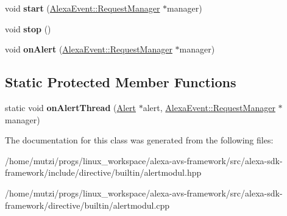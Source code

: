 \begin{DoxyCompactItemize}
\item 
\mbox{\label{classdirective_1_1Alert_a83b488b21df6d2e1dce21d8c9c253a8e}} 
void {\bfseries start} (\hyperlink{classAlexaEvent_1_1RequestManager}{Alexa\+Event\+::\+Request\+Manager} $\ast$manager)
\item 
\mbox{\label{classdirective_1_1Alert_a1f5d56e7494f5d8eb85a0f308a233e43}} 
void {\bfseries stop} ()
\item 
\mbox{\label{classdirective_1_1Alert_a55d52856f9ca04edabf2cfda08649c9c}} 
void {\bfseries on\+Alert} (\hyperlink{classAlexaEvent_1_1RequestManager}{Alexa\+Event\+::\+Request\+Manager} $\ast$manager)
\end{DoxyCompactItemize}
\subsection*{Static Protected Member Functions}
\begin{DoxyCompactItemize}
\item 
\mbox{\label{classdirective_1_1Alert_a40b28e621845769fe442dcfb7d2750aa}} 
static void {\bfseries on\+Alert\+Thread} (\hyperlink{classdirective_1_1Alert}{Alert} $\ast$alert, \hyperlink{classAlexaEvent_1_1RequestManager}{Alexa\+Event\+::\+Request\+Manager} $\ast$manager)
\end{DoxyCompactItemize}


The documentation for this class was generated from the following files\+:\begin{DoxyCompactItemize}
\item 
/home/mutzi/progs/linux\+\_\+workspace/alexa-\/avs-\/framework/src/alexa-\/sdk-\/framework/include/directive/builtin/alertmodul.\+hpp\item 
/home/mutzi/progs/linux\+\_\+workspace/alexa-\/avs-\/framework/src/alexa-\/sdk-\/framework/directive/builtin/alertmodul.\+cpp\end{DoxyCompactItemize}

